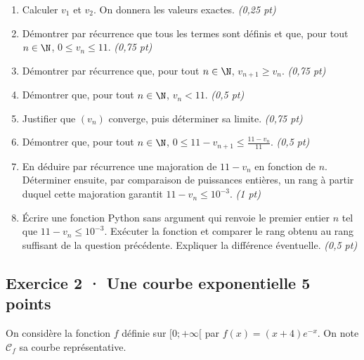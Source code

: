 \begin{enumerate}

\item Calculer $v_1$ et $v_2$. On donnera les valeurs exactes. \hfill\textit{(0,25 pt)}

\item Démontrer par récurrence que tous les termes sont définis et que, pour tout $n\in\N$, $0\le v_n\le11$. \hfill\textit{(0,75 pt)}

\item Démontrer par récurrence que, pour tout $n\in\N$, $v_{n+1}\ge v_n$. \hfill\textit{(0,75 pt)}

\item Démontrer que, pour tout $n\in\N$, $v_n<11$. \hfill\textit{(0,5 pt)}

\item Justifier que $(v_n)$ converge, puis déterminer sa limite. \hfill\textit{(0,75 pt)}

\item Démontrer que, pour tout $n\in\N$, $0\le 11-v_{n+1}\le\frac{11-v_n}{11}$. \hfill\textit{(0,5 pt)}

\item En déduire par récurrence une majoration de $11-v_n$ en fonction de $n$. Déterminer ensuite, par comparaison de puissances entières, un rang à partir duquel cette majoration garantit $11-v_n\le10^{-3}$. \hfill\textit{(1 pt)}

\item Écrire une fonction Python sans argument qui renvoie le premier entier $n$ tel que $11-v_n\le10^{-3}$. Exécuter la fonction et comparer le rang obtenu au rang suffisant de la question précédente. Expliquer la différence éventuelle. \hfill\textit{(0,5 pt)}

\end{enumerate}

\subsection*{Exercice 2 · Une courbe exponentielle \hfill 5 points}On considère la fonction $f$ définie sur $[0;+\infty[$ par $f(x)=(x+4)e^{-x}$. On note $\mathcal C_f$ sa courbe représentative.

